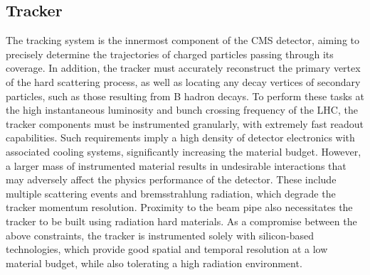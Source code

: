 \subsection{Tracker}

The tracking system is the innermost component of the CMS detector, aiming to precisely determine the trajectories of charged particles passing through its coverage. In addition, the tracker must accurately reconstruct the primary vertex of the hard scattering process, as well as locating any decay vertices of secondary particles, such as those resulting from B hadron decays. To perform these tasks at the high instantaneous luminosity and bunch crossing frequency of the LHC, the tracker components must be instrumented granularly, with extremely fast readout capabilities. Such requirements imply a high density of detector electronics with associated cooling systems, significantly increasing the material budget. However, a larger mass of instrumented material results in undesirable interactions that may adversely affect the physics performance of the detector. These include multiple scattering events and bremsstrahlung radiation, which degrade the tracker momentum resolution. Proximity to the beam pipe also necessitates the tracker to be built using radiation hard materials. As a compromise between the above constraints, the tracker is instrumented solely with silicon-based technologies, which provide good spatial and temporal resolution at a low material budget, while also tolerating a high radiation environment. 

